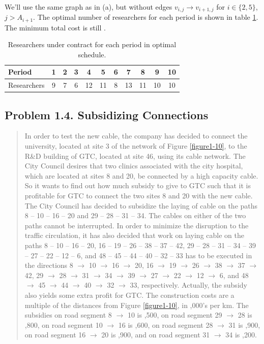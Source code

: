 \paragraph{}
We'll use the same graph as in (a), but without edges $v_{i, j} \rightarrow v_{i+1, j}$ for $i \in \{2, 5\}$, $j > A_{i+1}$. The optimal number of researchers for each period is shown in table \ref{researchers-1-3b}. The minimum total cost is still .

\begin{table}[H]
\centering
\begin{tabular}{lcccccccccc}
\hline
Period & 1 & 2 & 3 & 4 & 5 & 6 & 7 & 8 & 9 & 10 \\ \hline
Researchers & 9 & 7 & 6 & 12 & 11 & 8 & 13 & 11 & 10 & 10 \\ \hline
\end{tabular}
\caption{Researchers under contract for each period in optimal schedule.}
\label{researchers-1-3b}
\end{table}

\subsection{Problem 1.4. Subsidizing Connections}

\begin{quote}
In order to test the new cable, the company has decided to connect the university, located at site 3 of the network of Figure \ref{figure1-10}, to the R\&D building of GTC, located at site 46, using its cable network.
The City Council desires that two clinics associated with the city hospital, which are located at sites 8 and 20, be connected by a high capacity cable. So it wants to find out how much subsidy to give to GTC such that it is profitable for GTC to connect the two sites 8 and 20 with the new cable.
The City Council has decided to subsidize the laying of cable on the paths 8 – 10 – 16 – 20 and 29 – 28 – 31 – 34. The cables on either of the two paths cannot be interrupted. In order to minimize the disruption to the traffic circulation, it has also decided that work on laying cable on the paths 8 – 10 – 16 – 20, 16 – 19 – 26 – 38 – 37 – 42, 29 – 28 – 31 – 34 – 39 – 27 – 22 – 12 – 6, and 48 – 45 – 44 – 40 – 32 – 33 has to be executed in the directions 8 $\rightarrow$ 10 $\rightarrow$ 16 $\rightarrow$ 20, 16 $\rightarrow$ 19 $\rightarrow$ 26 $\rightarrow$ 38 $\rightarrow$ 37 $\rightarrow$ 42, 29 $\rightarrow$ 28 $\rightarrow$ 31 $\rightarrow$ 34 $\rightarrow$ 39 $\rightarrow$ 27 $\rightarrow$ 22 $\rightarrow$ 12 $\rightarrow$ 6, and 48 $\rightarrow$ 45  $\rightarrow$ 44 $\rightarrow$ 40 $\rightarrow$ 32 $\rightarrow$ 33, respectively. Actually, the subsidy also yields some extra profit for GTC. The construction costs are a multiple of the distances from Figure \ref{figure1-10}, in ,000’s per km. The subsidies on road segment 8 $\rightarrow$ 10 is ,500, on road segment 29 $\rightarrow$ 28 is ,800, on road segment 10 $\rightarrow$ 16 is ,600, on road segment 28 $\rightarrow$ 31 is ,900, on road segment 16 $\rightarrow$ 20 is ,900, and on road segment 31 $\rightarrow$ 34 is ,200.
\end{quote}

